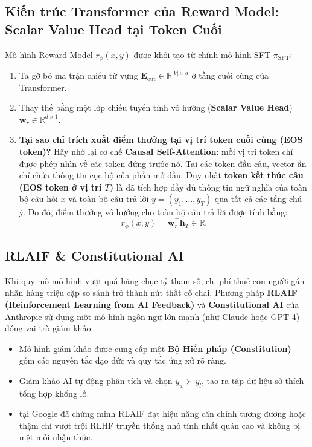 \subsection{Kiến trúc Transformer của Reward Model: Scalar Value Head tại Token Cuối}
Mô hình Reward Model $r_\phi(x, y)$ được khởi tạo từ chính mô hình SFT $\pi_{\text{SFT}}$:
\begin{enumerate}[leftmargin=1.2cm]
    \item Ta gỡ bỏ ma trận chiếu từ vựng $\mathbf{E}_{\text{out}} \in \mathbb{R}^{|V| \times d}$ ở tầng cuối cùng của Transformer.
    \item Thay thế bằng một lớp chiếu tuyến tính vô hướng (\textbf{Scalar Value Head}) $\mathbf{w}_r \in \mathbb{R}^{d \times 1}$.
    \item \textbf{Tại sao chỉ trích xuất điểm thưởng tại vị trí token cuối cùng (EOS token)?}
    Hãy nhớ lại cơ chế \textbf{Causal Self-Attention}: mỗi vị trí token chỉ được phép nhìn về các token đứng trước nó. Tại các token đầu câu, vector ẩn chỉ chứa thông tin cục bộ của phần mở đầu. Duy nhất \textbf{token kết thúc câu (EOS token ở vị trí $T$)} là đã tích hợp đầy đủ thông tin ngữ nghĩa của toàn bộ câu hỏi $x$ và toàn bộ câu trả lời $y = (y_1, \dots, y_T)$ qua tất cả các tầng chú ý. Do đó, điểm thưởng vô hướng cho toàn bộ câu trả lời được tính bằng:
    \begin{equation}
        r_\phi(x, y) = \mathbf{w}_r^\top \mathbf{h}_T \in \mathbb{R}.
    \end{equation}
\end{enumerate}

\subsection{RLAIF \& Constitutional AI \citep{bai2022constitutional, lee2023rlaif}}
Khi quy mô mô hình vượt quá hàng chục tỷ tham số, chi phí thuê con người gán nhãn hàng triệu cặp so sánh trở thành nút thắt cổ chai. Phương pháp \textbf{RLAIF (Reinforcement Learning from AI Feedback)} và \textbf{Constitutional AI} của Anthropic \citep{bai2022constitutional} sử dụng một mô hình ngôn ngữ lớn mạnh (như Claude hoặc GPT-4) đóng vai trò giám khảo:
\begin{itemize}[leftmargin=1.2cm]
    \item Mô hình giám khảo được cung cấp một \textbf{Bộ Hiến pháp (Constitution)} gồm các nguyên tắc đạo đức và quy tắc ứng xử rõ ràng.
    \item Giám khảo AI tự động phân tích và chọn $y_w \succ y_l$, tạo ra tập dữ liệu sở thích tổng hợp khổng lồ.
    \item \citet{lee2023rlaif} tại Google đã chứng minh RLAIF đạt hiệu năng căn chỉnh tương đương hoặc thậm chí vượt trội RLHF truyền thống nhờ tính nhất quán cao và không bị mệt mỏi nhận thức.
\end{itemize}

